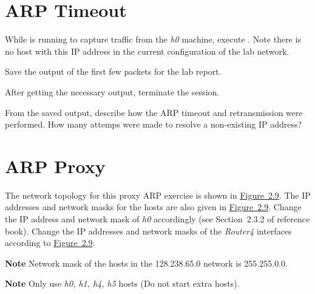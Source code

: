 \documentclass{../UTNetLab}
\begin{document}
\section{ARP Timeout}
While  is running to capture traffic from the \textit{h0} machine, execute .
Note there is no host with this IP address in the current configuration of the lab network.

Save the  output of the first few packets for the lab report.

After getting the necessary output, terminate the  session.

\begin{report}
    \item From the saved  output, describe how the ARP timeout and retransmission were performed.
    How many attemps were made to resolve a non-existing IP address?
\end{report}

\section{ARP Proxy}
The network topology for this proxy ARP exercise is shown in \hyperref[fig:2.9]{Figure~2.9}.
The IP addresses and network masks for the hosts are also given in \hyperref[fig:2.9]{Figure~2.9}.
Change the IP address and network mask of \textit{h0} accordingly (see Section~2.3.2 of reference book).
Change the IP addresses and network masks of the \textit{Router4} interfaces according to \hyperref[fig:2.9]{Figure~2.9}.

\textbf{Note}\quad
Network mask of the hosts in the 128.238.65.0 network is 255.255.0.0.

\textbf{Note}\quad
Only use \textit{h0, h1, h4, h5} hosts (Do not start extra hosts).
\end{document}
